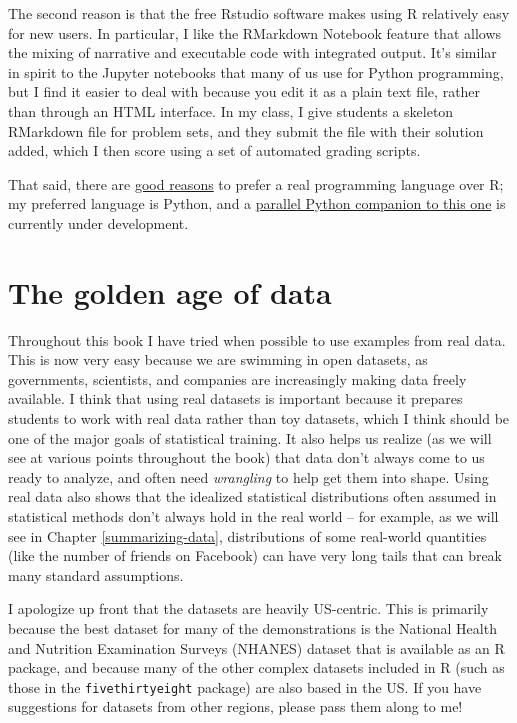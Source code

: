 \documentclass[
  12pt,
]{book}
\begin{document}
The second reason is that the free Rstudio software makes using R relatively easy for new users. In particular, I like the RMarkdown Notebook feature that allows the mixing of narrative and executable code with integrated output. It's similar in spirit to the Jupyter notebooks that many of us use for Python programming, but I find it easier to deal with because you edit it as a plain text file, rather than through an HTML interface. In my class, I give students a skeleton RMarkdown file for problem sets, and they submit the file with their solution added, which I then score using a set of automated grading scripts.

That said, there are \href{https://medium.com/@data_driven/python-vs-r-for-data-science-and-the-winner-is-3ebb1a968197}{good reasons} to prefer a real programming language over R; my preferred language is Python, and a \href{https://github.com/statsthinking21/statsthinking21-python}{parallel Python companion to this one} is currently under development.

\hypertarget{the-golden-age-of-data}{%
\section{The golden age of data}\label{the-golden-age-of-data}}

Throughout this book I have tried when possible to use examples from real data. This is now very easy because we are swimming in open datasets, as governments, scientists, and companies are increasingly making data freely available. I think that using real datasets is important because it prepares students to work with real data rather than toy datasets, which I think should be one of the major goals of statistical training. It also helps us realize (as we will see at various points throughout the book) that data don't always come to us ready to analyze, and often need \emph{wrangling} to help get them into shape. Using real data also shows that the idealized statistical distributions often assumed in statistical methods don't always hold in the real world -- for example, as we will see in Chapter \ref{summarizing-data}, distributions of some real-world quantities (like the number of friends on Facebook) can have very long tails that can break many standard assumptions.

I apologize up front that the datasets are heavily US-centric. This is primarily because the best dataset for many of the demonstrations is the National Health and Nutrition Examination Surveys (NHANES) dataset that is available as an R package, and because many of the other complex datasets included in R (such as those in the \texttt{fivethirtyeight} package) are also based in the US. If you have suggestions for datasets from other regions, please pass them along to me!
\end{document}
